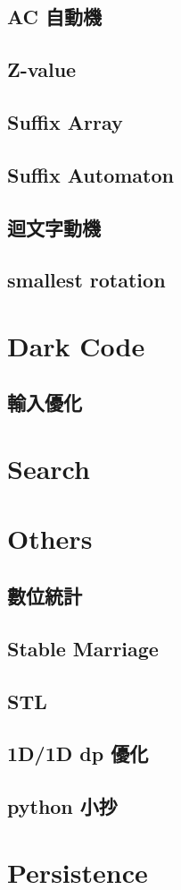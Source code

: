 \subsection{AC 自動機}

\subsection{Z-value}

\subsection{Suffix Array}

\subsection{Suffix Automaton}

\subsection{迴文字動機}

\subsection{smallest rotation}


\section{Dark Code}

\subsection{輸入優化}


\section{Search}


\section{Others}

\subsection{數位統計}

\subsection{Stable Marriage}

\subsection{STL}

\subsection{1D/1D dp 優化}

\subsection{python 小抄}



\section{Persistence}

